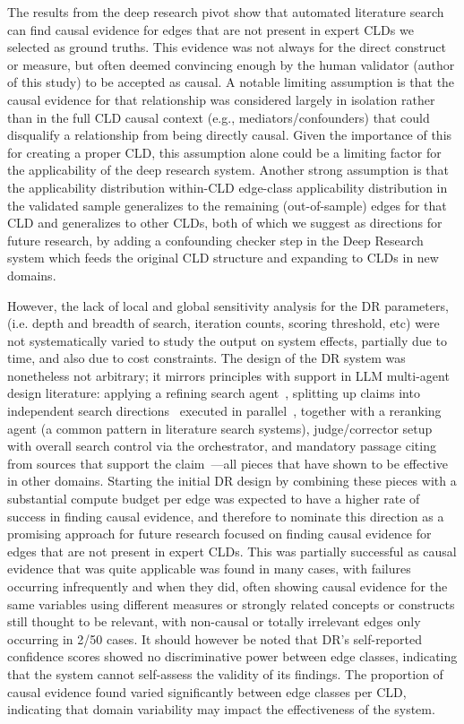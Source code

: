 The results from the deep research pivot show that automated literature search can find causal evidence for edges that are not present in expert CLDs we selected as ground truths. This evidence was not always for the direct construct or measure, but often deemed convincing enough by the human validator (author of this study) to be accepted as causal.
A notable limiting assumption is that the causal evidence for that relationship was considered 
largely in isolation rather than in the full CLD causal context (e.g., mediators/confounders) that could disqualify a
relationship from being directly causal. Given the importance of this for creating a proper CLD, this assumption alone could be a limiting factor for the applicability of the deep research system.
Another strong assumption is that the applicability distribution within-CLD edge-class applicability distribution
in the validated sample generalizes to the remaining (out-of-sample) edges for that CLD and generalizes to other CLDs, both of which we suggest as directions for future research, by adding a confounding checker step in the Deep Research system which feeds the original CLD structure and expanding to CLDs in new domains.

However, the lack of local and global sensitivity analysis for the DR parameters, (i.e. depth and breadth of search, iteration counts, scoring threshold, etc) were not systematically varied to study the output on system effects, partially due to time, and also due to cost constraints.
The design of the DR system was nonetheless not arbitrary; it mirrors principles with support in LLM multi-agent design literature: applying a refining search agent~\citep{madaan2023selfrefineiterativerefinementselffeedback}, splitting up claims into independent search directions~\citep{dhuliawala2024chain} executed in parallel~\citep{snell2024scalingllmtesttimecompute}, together with a reranking agent (a common pattern in literature search systems), judge/corrector setup with overall search control via the orchestrator, and mandatory passage citing from sources that support the claim~\citep{batista2025safeimprovingllmsystems}---all pieces that have shown to be effective in other domains. Starting the initial DR design by combining these pieces with a substantial compute budget per edge was expected to have a higher rate of success in finding causal evidence, and therefore to nominate this direction as a promising approach for future research focused on finding causal evidence for edges that are not present in expert CLDs.
This was partially successful as causal evidence that was quite applicable was found in many cases, with failures occurring infrequently and when they did, often showing causal evidence for the same variables using different measures or strongly related concepts or constructs still thought to be relevant, with non-causal or totally irrelevant edges only occurring in 2/50 cases. It should however be noted that DR's self-reported confidence scores showed no discriminative power between edge classes, indicating that the system cannot self-assess the validity of its findings. The proportion of causal evidence found varied significantly between edge classes per CLD, indicating that domain variability may impact the effectiveness of the system.


